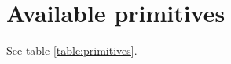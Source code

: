 \documentclass[10pt,a4paper]{article}
\newcommand{\myvec}[1] {\mathbf{\boldsymbol{#1}}}
\begin{document}
%
%
%
%
%
%
%
%










%
%
%
%
%
%
\section{Available primitives}

See table \ref{table:primitives}.
\end{document}

